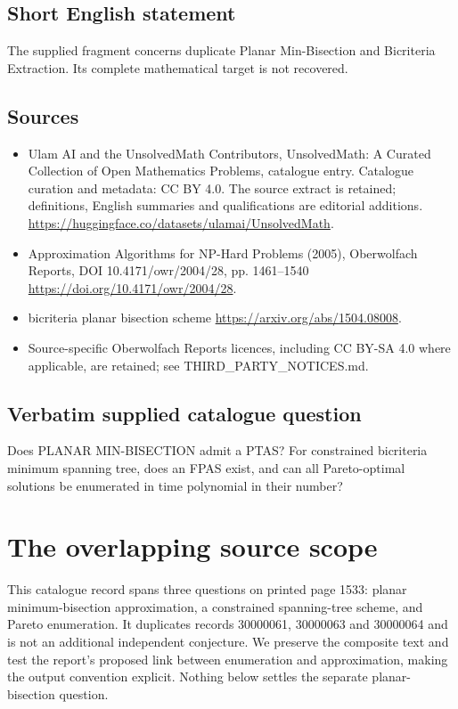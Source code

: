 \documentclass[11pt]{article}
\begin{document}
\subsection{Short English statement}
The supplied fragment concerns duplicate Planar Min-Bisection and Bicriteria Extraction. Its complete mathematical target is not recovered.
\subsection{Sources}
\begin{itemize}
\item[S1] Ulam AI and the UnsolvedMath Contributors, UnsolvedMath: A Curated Collection of Open Mathematics Problems, catalogue entry. Catalogue curation and metadata: CC BY 4.0. The source extract is retained; definitions, English summaries and qualifications are editorial additions.
\url{https://huggingface.co/datasets/ulamai/UnsolvedMath}.
\item[S2] Approximation Algorithms for NP-Hard Problems (2005), Oberwolfach Reports, DOI 10.4171/owr/2004/28, pp. 1461--1540
\url{https://doi.org/10.4171/owr/2004/28}.
\item[S3] bicriteria planar bisection scheme
\url{https://arxiv.org/abs/1504.08008}.
\item Source-specific Oberwolfach Reports licences, including CC BY-SA 4.0 where applicable, are retained; see THIRD\_PARTY\_NOTICES.md.
\end{itemize}
\subsection{Verbatim supplied catalogue question}
Does PLANAR MIN-BISECTION admit a PTAS? For constrained bicriteria minimum spanning tree, does an FPAS exist, and can all Pareto-optimal solutions be enumerated in time polynomial in their number?

\section{The overlapping source scope}
This catalogue record spans three questions on printed page 1533:
planar minimum-bisection approximation, a constrained spanning-tree
scheme, and Pareto enumeration. It duplicates records 30000061,
30000063 and 30000064 and is not an additional independent conjecture.
We preserve the composite text and test the report's proposed link
between enumeration and approximation, making the output convention
explicit. Nothing below settles the separate planar-bisection question.
\end{document}
